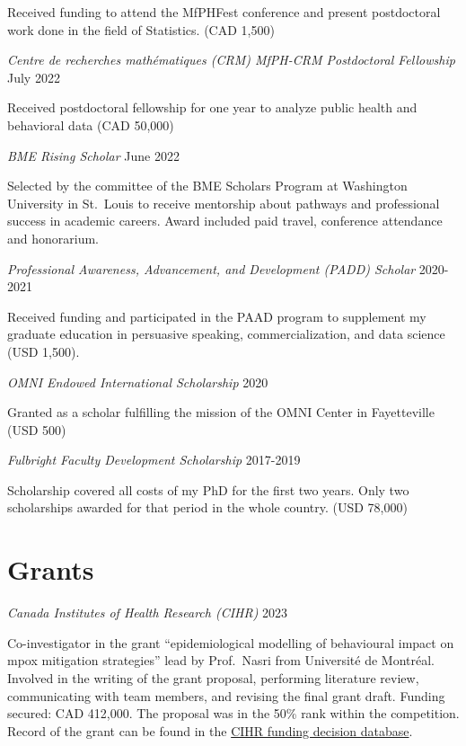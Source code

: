 \documentclass[10pt,]{article}
\begin{document}
Received funding to attend the MfPHFest conference and present
postdoctoral work done in the field of Statistics. (CAD 1,500)

\emph{Centre de recherches mathématiques (CRM) MfPH-CRM Postdoctoral
Fellowship} \hfill July 2022

Received postdoctoral fellowship for one year to analyze public health
and behavioral data (CAD 50,000)

\emph{BME Rising Scholar} \hfill June 2022

Selected by the committee of the BME Scholars Program at Washington
University in St.~Louis to receive mentorship about pathways and
professional success in academic careers. Award included paid travel,
conference attendance and honorarium.

\emph{Professional Awareness, Advancement, and Development (PADD)
Scholar} \hfill 2020-2021

Received funding and participated in the PAAD program to supplement my
graduate education in persuasive speaking, commercialization, and data
science (USD 1,500).

\emph{OMNI Endowed International Scholarship} \hfill 2020

Granted as a scholar fulfilling the mission of the OMNI Center in
Fayetteville (USD 500)

\emph{Fulbright Faculty Development Scholarship} \hfill 2017-2019

Scholarship covered all costs of my PhD for the first two years. Only
two scholarships awarded for that period in the whole country. (USD
78,000)

\section{Grants}\label{grants}

\emph{Canada Institutes of Health Research (CIHR)} \hfill 2023

Co-investigator in the grant ``epidemiological modelling of behavioural
impact on mpox mitigation strategies'' lead by Prof.~Nasri from
Université de Montréal. Involved in the writing of the grant proposal,
performing literature review, communicating with team members, and
revising the final grant draft. Funding secured: CAD 412,000. The
proposal was in the 50\% rank within the competition. Record of the
grant can be found in the
\href{https://webapps.cihr-irsc.gc.ca/decisions/p/project_details.html?applId=481271&lang=en}{CIHR funding decision database}.
\end{document}
